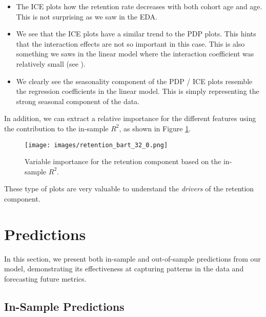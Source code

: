 \documentclass[11pt]{amsart}
\theoremstyle{definition}
\begin{document}
\begin{itemize}
    \item The ICE plots how the retention rate decreases with both cohort age and age. This is not surprising as we saw in the EDA.
    \item We see that the ICE plots have a similar trend to the PDP plots. This hints that the interaction effects are
          not so important in this case. This is also something we saws in the linear model where the interaction coefficient
          was relatively small (see \cite{orduz_retention}).
    \item We clearly see the seasonality component of the PDP / ICE plots resemble the regression coefficients in the linear
          model. This is simply representing the strong seasonal component of the data.
\end{itemize}

In addition, we can extract a relative importance for the different features using the contribution to the in-sample $R^2$,
as shown in Figure \ref{fig:variable_importance}.

\begin{figure}
    \centering
    \texttt{[image: images/retention\_bart\_32\_0.png]}
    \caption{Variable importance for the retention component based on the in-sample $R^2$.}
    \label{fig:variable_importance}
\end{figure}

These type of plots are very valuable to understand the {\em drivers} of the retention component.

\section{Predictions}

In this section, we present both in-sample and out-of-sample predictions from our model, demonstrating its effectiveness at
capturing patterns in the data and forecasting future metrics.

\subsection{In-Sample Predictions}
\end{document}
